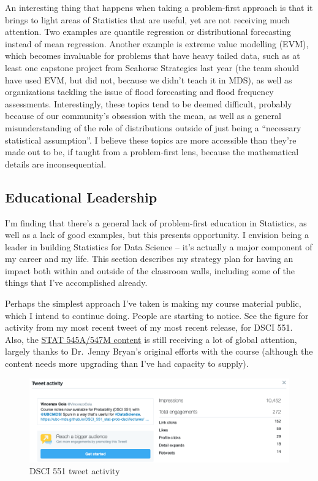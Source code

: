 \documentclass[]{article}
\begin{document}
An interesting thing that happens when taking a problem-first approach is that it brings to light areas of Statistics that are useful, yet are not receiving much attention. Two examples are quantile regression or distributional forecasting instead of mean regression. Another example is extreme value modelling (EVM), which becomes invaluable for problems that have heavy tailed data, such as at least one capstone project from Seahorse Strategies last year (the team should have used EVM, but did not, because we didn't teach it in MDS), as well as organizations tackling the issue of flood forecasting and flood frequency assessments. Interestingly, these topics tend to be deemed difficult, probably because of our community's obsession with the mean, as well as a general misunderstanding of the role of distributions outside of just being a ``necessary statistical assumption''. I believe these topics are more accessible than they're made out to be, if taught from a problem-first lens, because the mathematical details are inconsequential.

\hypertarget{educational-leadership}{%
\subsection{Educational Leadership}\label{educational-leadership}}

I'm finding that there's a general lack of problem-first education in Statistics, as well as a lack of good examples, but this presents opportunity. I envision being a leader in building Statistics for Data Science -- it's actually a major component of my career and my life. This section describes my strategy plan for having an impact both within and outside of the classroom walls, including some of the things that I've accomplished already.

Perhaps the simplest approach I've taken is making my course material public, which I intend to continue doing. People are starting to notice. See the figure for activity from my most recent tweet of my most recent release, for DSCI 551. Also, the \href{https://stat545guidebook.netlify.com/}{STAT 545A/547M content} is still receiving a lot of global attention, largely thanks to Dr.~Jenny Bryan's original efforts with the course (although the content needs more upgrading than I've had capacity to supply).

\begin{figure}
\centering
\includegraphics{./img/551_tweet.png}
\caption{DSCI 551 tweet activity}
\end{figure}
\end{document}
